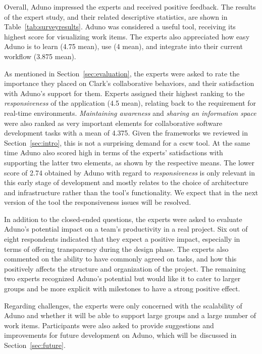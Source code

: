 \documentclass[conference]{IEEEtran}
\begin{document}
Overall, Aduno impressed the experts and received positive feedback. The results of the expert study, and their related descriptive statistics, are shown in Table~\ref{tab:surveyresults}. 
Aduno was considered a useful tool, receiving its highest score for visualizing work items. The experts also appreciated how easy Aduno is to learn (4.75 mean), use (4 mean), and integrate into their current workflow (3.875 mean).

As mentioned in Section~\ref{sec:evaluation}, the experts were asked to rate the importance they placed on Clark's \cite{Clark96} collaborative behaviors, and their satisfaction with Aduno's support for them. Experts assigned their highest ranking to the \textit{responsiveness} of the application (4.5 mean), relating back to the requirement for real-time environments. \textit{Maintaining awareness} and \textit{sharing an information space} were also ranked as very important elements for collaborative software development tasks with a mean of 4.375. Given the frameworks we reviewed in Section~\ref{sec:intro}, this is not a surprising demand for a {\sc cscw} tool. At the same time Aduno also scored high in terms of the experts' satisfactions with supporting the latter two elements, as shown by the respective means. The lower score of 2.74 obtained by Aduno with regard to \textit{responsiveness} is only relevant in this early stage of development and mostly relates to the choice of architecture and infrastructure rather than the tool's functionality. We expect that in the next version of the tool the responsiveness issues will be resolved. 


In addition to the closed-ended questions, the experts were asked to evaluate Aduno's potential impact on a team's productivity in a real project. Six out of eight respondents indicated that they expect a positive impact, especially in terms of offering transparency during the design phase. The experts also commented on the ability to have commonly agreed on tasks, and how this positively affects the structure and organization of the project. The remaining two experts recognized Aduno's potential but would like it to cater to larger groups and be more explicit with milestones to have a strong positive effect.

Regarding challenges, the experts were only concerned with the scalability of Aduno and whether it will be able to support large groups and a large number of work items. Participants were also asked to provide suggestions and improvements for future development on Aduno, which will be discussed in Section~\ref{sec:future}.
\end{document}
